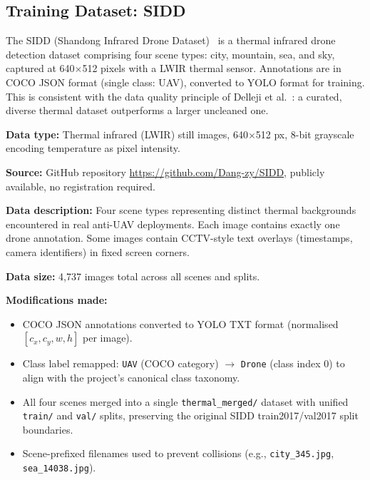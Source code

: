 \documentclass[12pt,a4paper]{report}
\begin{document}
\subsection{Training Dataset: SIDD}

The SIDD (Shandong Infrared Drone Dataset)~\cite{sidd2023} is a thermal
infrared drone detection dataset comprising four scene types: city, mountain,
sea, and sky, captured at 640$\times$512 pixels with a LWIR thermal sensor.
Annotations are in COCO JSON format (single class: UAV), converted to YOLO
format for training. This is consistent with the data quality principle of
Delleji et al.~\cite{delleji2025thermal}: a curated, diverse thermal dataset
outperforms a larger uncleaned one.

\textbf{Data type:} Thermal infrared (LWIR) still images, 640$\times$512 px,
8-bit grayscale encoding temperature as pixel intensity.

\textbf{Source:} GitHub repository \url{https://github.com/Dang-zy/SIDD},
publicly available, no registration required.

\textbf{Data description:} Four scene types representing distinct thermal
backgrounds encountered in real anti-UAV deployments. Each image contains
exactly one drone annotation. Some images contain CCTV-style text overlays
(timestamps, camera identifiers) in fixed screen corners.

\textbf{Data size:} 4,737 images total across all scenes and splits.

\textbf{Modifications made:}
\begin{itemize}
  \item COCO JSON annotations converted to YOLO TXT format
        (normalised $[c_x, c_y, w, h]$ per image).
  \item Class label remapped: \texttt{UAV} (COCO category) $\to$
        \texttt{Drone} (class index 0) to align with the project's
        canonical class taxonomy.
  \item All four scenes merged into a single \texttt{thermal\_merged/}
        dataset with unified \texttt{train/} and \texttt{val/} splits,
        preserving the original SIDD train2017/val2017 split boundaries.
  \item Scene-prefixed filenames used to prevent collisions
        (e.g., \texttt{city\_345.jpg}, \texttt{sea\_14038.jpg}).
\end{itemize}
\end{document}
